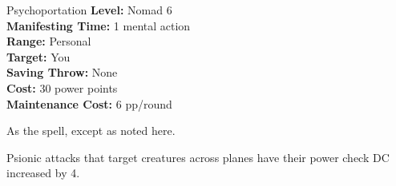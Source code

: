 {Psychoportation}
{
	\textbf{Level:}
	Nomad 6\\
	\textbf{Manifesting Time:}
	1 mental action\\
	\textbf{Range:}
	Personal\\
	\textbf{Target:}
	You\\
	\textbf{Saving Throw:}
	None\\
	\textbf{Cost:}
	30 power points\\
	\textbf{Maintenance Cost:}
	6 pp/round\\
}
{
	As the  spell, except as noted here.

	Psionic attacks that target creatures across planes have their power check DC increased by 4. %
}
